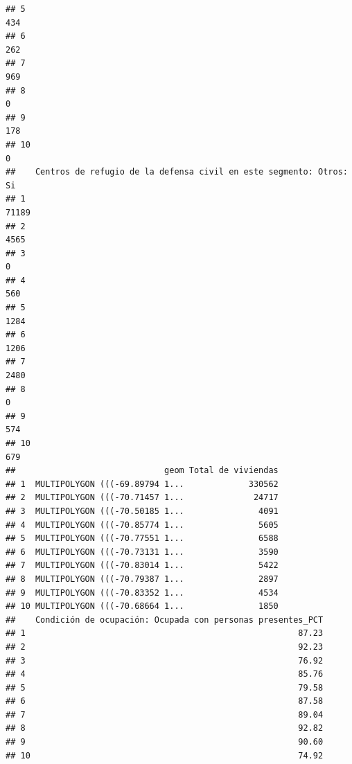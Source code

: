 \documentclass[11pt,]{article}
\begin{document}
\begin{verbatim}
## 5                                                                            434
## 6                                                                            262
## 7                                                                            969
## 8                                                                              0
## 9                                                                            178
## 10                                                                             0
##    Centros de refugio de la defensa civil en este segmento: Otros: Si
## 1                                                               71189
## 2                                                                4565
## 3                                                                   0
## 4                                                                 560
## 5                                                                1284
## 6                                                                1206
## 7                                                                2480
## 8                                                                   0
## 9                                                                 574
## 10                                                                679
##                              geom Total de viviendas
## 1  MULTIPOLYGON (((-69.89794 1...             330562
## 2  MULTIPOLYGON (((-70.71457 1...              24717
## 3  MULTIPOLYGON (((-70.50185 1...               4091
## 4  MULTIPOLYGON (((-70.85774 1...               5605
## 5  MULTIPOLYGON (((-70.77551 1...               6588
## 6  MULTIPOLYGON (((-70.73131 1...               3590
## 7  MULTIPOLYGON (((-70.83014 1...               5422
## 8  MULTIPOLYGON (((-70.79387 1...               2897
## 9  MULTIPOLYGON (((-70.83352 1...               4534
## 10 MULTIPOLYGON (((-70.68664 1...               1850
##    Condición de ocupación: Ocupada con personas presentes_PCT
## 1                                                       87.23
## 2                                                       92.23
## 3                                                       76.92
## 4                                                       85.76
## 5                                                       79.58
## 6                                                       87.58
## 7                                                       89.04
## 8                                                       92.82
## 9                                                       90.60
## 10                                                      74.92

\end{verbatim}
\end{document}
